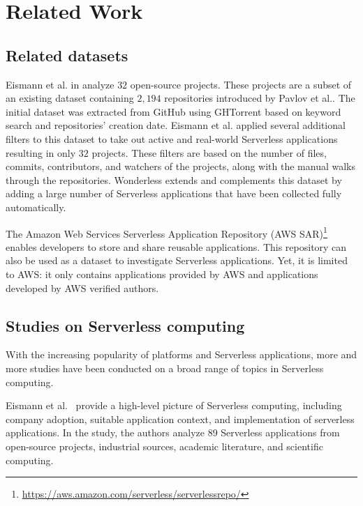 
\section{Related Work}
\label{relatedwork}

\subsection{Related datasets}
Eismann et al. in \cite{eismann2020serverless} analyze
$32$ open-source projects. These projects are a subset of 
an existing dataset containing $2,194$ repositories introduced by 
Pavlov et al.\cite{pavlov2019serverless}. The initial dataset was extracted 
from GitHub using GHTorrent based on keyword search and repositories' 
creation date. Eismann et al. applied several additional filters to this dataset 
to take out active and real-world Serverless applications resulting in only $32$
projects. These filters are based on the number of files, commits, 
contributors, and watchers of the projects, along with the manual walks 
through the repositories. Wonderless extends and complements 
this dataset by adding a large number of Serverless applications that 
have been collected fully automatically.

The Amazon Web Services Serverless Application Repository
(AWS SAR)\footnote{\url{https://aws.amazon.com/serverless/serverlessrepo/}} 
enables developers to store and share reusable applications. 
This repository can also be used as a dataset to investigate Serverless 
applications. Yet, it is limited to AWS: it only contains 
applications provided by AWS and applications developed by 
AWS verified authors.


\subsection{Studies on Serverless computing}

With the increasing popularity of \faas platforms and Serverless applications, 
more and more studies have been conducted on a broad range of topics in 
Serverless computing. 

Eismann et al.~\cite{eismann2020serverless} provide a  
high-level picture of Serverless computing, including 
company adoption, suitable application context, and implementation 
of serverless applications.
In the study, the authors analyze 89 Serverless applications from open-source projects, 
industrial sources, academic literature, and scientific computing. 


